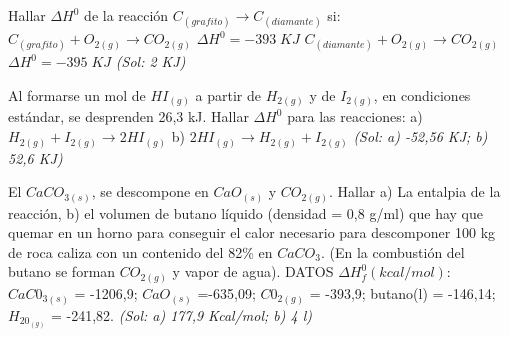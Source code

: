 \begin{multicols}{2}
\begin{problem}
\end{problem}

\begin{problem}
	Hallar $\Delta H^0$ de la reacción $C_{(grafito)} \longrightarrow C_{(diamante)}$ si:\\
	$C_{(grafito)} + O_{2(g)} \longrightarrow  CO_{2(g)}$ $\Delta H^0 = -393\; KJ$
	$C_{(diamante)} + O_{2(g)} \longrightarrow  CO_{2(g)}$ $\Delta H^0 = -395\; KJ$
	\textit{\scriptsize (Sol: 2 KJ)}
	
\end{problem}

\begin{problem}
Al formarse un mol de $HI_{(g)}$ a partir de $H_{2(g)}$ y de $I_{2(g)}$, en condiciones estándar, se desprenden 26,3 kJ. Hallar $\Delta H^0$ para las reacciones: a) $H_{2(g)} + I_{2(g)} \longrightarrow 2HI_{(g)}$	b) $2HI_{(g)} \longrightarrow H_{2(g)} + I_{2(g)}$ \textit{\scriptsize(Sol: a) -52,56 KJ; b) 52,6 KJ)}
	
\end{problem}
	
\begin{problem}
	El $CaCO_{3(s)}$, se descompone en $CaO_{(s)}$ y $CO_{2(g)}$. Hallar a) La entalpia de la reacción, b) el volumen de butano líquido (densidad = 0,8 g/ml) que hay que quemar en un horno para conseguir el calor necesario para descomponer 100 kg de roca caliza con un contenido del 82\% en $CaCO_3$. (En la combustión del butano se forman $CO_{2(g)}$ y vapor de agua). DATOS $\Delta H_f^0 (kcal/mol):$ $CaC0_{3(s)}$ = -1206,9; $CaO_{(s)}$ =-635,09; $C0_{2(g)}$ = -393,9; butano(l) = -146,14; $H_20_{(g)}$ = -241,82. \textit{\scriptsize (Sol: a) 177,9 Kcal/mol; b) 4 l)}


\end{problem}

\begin{problem}
	
\end{problem}

\begin{problem}
	
\end{problem}

\begin{problem}
	
\end{problem}

\begin{problem}
	
\end{problem}


\end{multicols}

